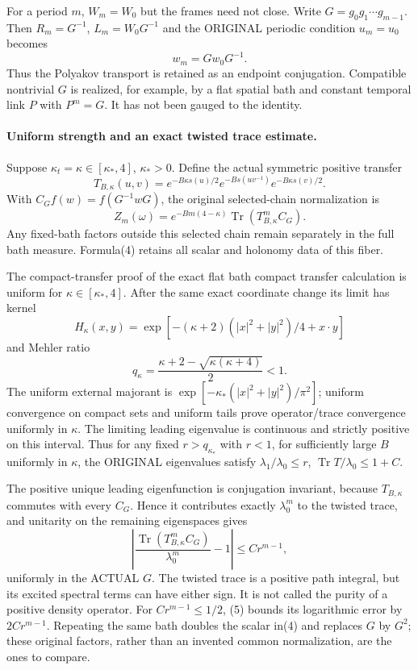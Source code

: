 \documentclass[11pt]{article}
\begin{document}
For a period $m$, $W_m=W_0$ but the frames need not close. Write
$G=g_0g_1\cdots g_{m-1}$. Then $R_m=G^{-1}$, $L_m=W_0G^{-1}$ and the ORIGINAL
periodic condition $u_m=u_0$ becomes
\[
 w_m=G w_0G^{-1}.                                    \tag{3}
\]
Thus the Polyakov transport is retained as an endpoint conjugation. Compatible
nontrivial $G$ is realized, for example, by a flat spatial bath and constant
temporal link $P$ with $P^m=G$. It has not been gauged to the identity.

\paragraph{Uniform strength and an exact twisted trace estimate.}
Suppose $\kappa_t=\kappa\in[\kappa_*,4]$, $\kappa_*>0$. Define the actual
symmetric positive transfer
\[
 T_{B,\kappa}(u,v)=e^{-B\kappa s(u)/2}
                 e^{-Bs(uv^{-1})}e^{-B\kappa s(v)/2}.
\]
With $C_G f(w)=f(G^{-1}wG)$, the original selected-chain normalization is
\[
 Z_m(\omega)=e^{-B m(4-\kappa)}
             \operatorname{Tr}(T_{B,\kappa}^{m}C_G).  \tag{4}
\]
Any fixed-bath factors outside this selected chain remain separately in the
full bath measure. Formula(4) retains all scalar and holonomy data of this fiber.

The compact-transfer proof of the exact flat bath compact transfer calculation is uniform for $\kappa\in[\kappa_*,4]$.
After the same exact coordinate change its limit has kernel
\[
 H_\kappa(x,y)=\exp[-(\kappa+2)(|x|^2+|y|^2)/4+x\cdot y]
\]
and Mehler ratio
\[
 q_\kappa=\frac{\kappa+2-\sqrt{\kappa(\kappa+4)}}2<1.
\]
The uniform external majorant is
$\exp[-\kappa_*(|x|^2+|y|^2)/\pi^2]$; uniform convergence on compact sets and
uniform tails prove operator/trace convergence uniformly in $\kappa$.
The limiting leading eigenvalue is continuous and strictly positive on this
interval. Thus for any fixed $r>q_{\kappa_*}$ with $r<1$, for sufficiently large
$B$ uniformly in $\kappa$, the ORIGINAL eigenvalues satisfy
$\lambda_1/\lambda_0\le r$, $\operatorname{Tr}T/\lambda_0\le1+C$.

The positive unique leading eigenfunction is conjugation invariant, because
$T_{B,\kappa}$ commutes with every $C_G$. Hence it contributes exactly
$\lambda_0^m$ to the twisted trace, and unitarity on the remaining eigenspaces gives
\[
 \left|\frac{\operatorname{Tr}(T_{B,\kappa}^m C_G)}{\lambda_0^m}-1\right|
 \le C r^{m-1},                                     \tag{5}
\]
uniformly in the ACTUAL $G$. The twisted trace is a positive path integral,
but its excited spectral terms can have either sign. It is not called the purity
of a positive density operator. For $Cr^{m-1}\le1/2$, (5) bounds its logarithmic
error by $2Cr^{m-1}$. Repeating the same bath doubles the scalar in(4) and replaces
$G$ by $G^2$; these original factors, rather than an invented common normalization,
are the ones to compare.
\end{document}
